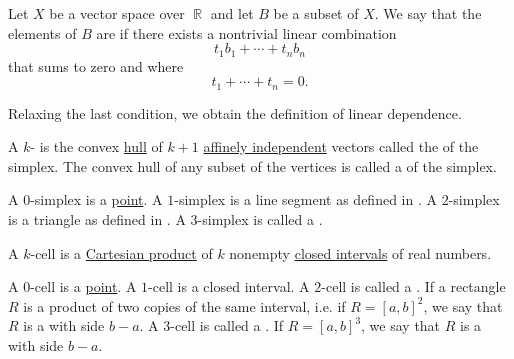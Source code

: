 \begin{definition}\label{def:affine_dependence}\mimprovised
  Let \( X \) be a vector space over \( \BbbR \) and let \( B \) be a subset of \( X \). We say that the elements of \( B \) are  if there exists a nontrivial linear combination
  \begin{equation*}
    t_1 b_1 + \cdots + t_n b_n
  \end{equation*}
  that sums to zero and where
  \begin{equation*}
    t_1 + \cdots + t_n = 0.
  \end{equation*}

  Relaxing the last condition, we obtain the definition of linear dependence.
\end{definition}

\begin{definition}\label{def:simplex}
  A \( k \)- is the convex \hyperref[def:convex_set/hull]{hull} of \( k + 1 \) \hyperref[def:affine_dependence]{affinely independent} vectors called the  of the simplex. The convex hull of any subset of the vertices is called a  of the simplex.

  \begin{thmenum}
     A \( 0 \)-simplex is a \hyperref[def:point]{point}.
     A \( 1 \)-simplex is a line segment as defined in .
     A \( 2 \)-simplex is a triangle as defined in .
     A \( 3 \)-simplex is called a .
  \end{thmenum}
\end{definition}

\begin{definition}\label{def:k_cell}
  A \( k \)-cell is a \hyperref[def:cartesian_product]{Cartesian product} of \( k \) nonempty \hyperref[def:partially_ordered_set_interval/closed]{closed intervals} of real numbers.

  \begin{thmenum}
     A \( 0 \)-cell is a \hyperref[def:point]{point}.
     A \( 1 \)-cell is a closed interval.
     A \( 2 \)-cell is called a . If a rectangle \( R \) is a product of two copies of the same interval, i.e. if \( R = [a, b]^2 \), we say that \( R \) is a  with side \( b - a \).
     A \( 3 \)-cell is called a . If \( R = [a, b]^3 \), we say that \( R \) is a  with side \( b - a \).
  \end{thmenum}
\end{definition}


